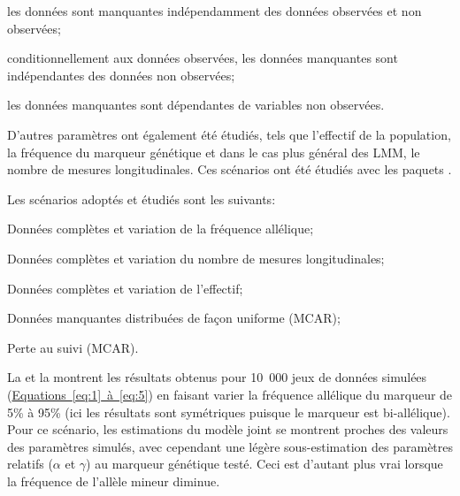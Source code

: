 \documentclass[11pt, a4paper]{article}
\begin{document}
\begin{description}
    \addtolength{\itemindent}{1cm}
    \item[MCAR (missing completely at random):] les données sont manquantes indépendamment des données observées et non observées;
    \item[MAR (missing at random):] conditionnellement aux données observées, les données manquantes sont indépendantes des données non observées;
    \item[MNAR (missing not at random):] les données manquantes sont dépendantes de variables non observées.
\end{description}
\par{D’autres paramètres ont également été étudiés, tels que l’effectif de la population,
la fréquence du marqueur génétique et dans le cas plus général des LMM, le nombre de mesures longitudinales.
Ces scénarios ont été étudiés avec les paquets .}
\par{Les scénarios adoptés et étudiés sont les suivants:
\begin{description}
    \addtolength{\itemindent}{1cm}
    \item[Scénario 1] Données complètes et variation de la fréquence allélique;
    \item[Scénario 2] Données complètes et variation du nombre de mesures longitudinales;
    \item[Scénario 3] Données complètes et variation de l'effectif;
    \item[Scénario 4] Données manquantes distribuées de façon uniforme (MCAR);
    \item[Scénario 5] Perte au suivi (MCAR).
\end{description}
}
\par{
La  et la  montrent les résultats obtenus pour 10~000 jeux de données simulées (\hyperref[eq:1]{Equations~\ref*{eq:1}~à~\ref{eq:5}})
en faisant varier la fréquence allélique du marqueur de 5\% à 95\% (ici les résultats sont symétriques puisque le marqueur est bi-allélique).
Pour ce scénario, les estimations du modèle joint se montrent proches des valeurs des paramètres simulés, avec cependant une légère sous-estimation des paramètres relatifs ($\alpha$ et $\gamma$) au marqueur génétique testé.
Ceci est d'autant plus vrai lorsque la fréquence de l'allèle mineur diminue.
\begin{figure}[ht]
    \begin{center}
        \label{fig:Scenario1}
    \end{center}
\end{figure}
}
\end{document}
